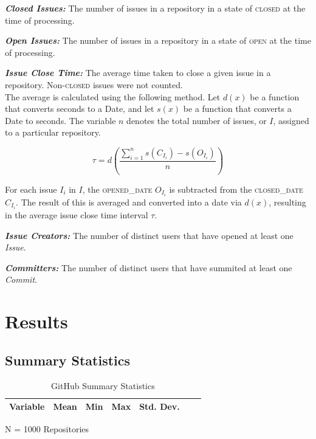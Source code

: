 \documentclass{proc}
\begin{document}
\noindent \textbf{\textit{Closed Issues:}}
The number of issues in a repository in a state of \textsc{closed} at the time of processing.

\noindent \textbf{\textit{Open Issues:}}
The number of issues in a repository in a state of \textsc{open} at the time of processing.

\noindent \textbf{\textit{Issue Close Time:}}
The average time taken to close a given issue in a repository. Non-\textsc{closed} issues were not counted.\\

The average is calculated using the following method. Let $d(x)$ be a function that converts seconds to a Date, and let $s(x)$ be a function that converts a Date to seconds. The variable $n$ denotes the total number of issues, or $I$, assigned to a particular repository.

\[ \tau = d\left( \frac{\sum_{i=1}^{n} s(C_{I_i} ) - s(O_{I_i} )  } {n} \right) \]

For each issue $I_i$ in $I$, the \textsc{opened\_date} $O_{I_i}$ is subtracted from the \textsc{closed\_date} $C_{I_i}$. The result of this is averaged and converted into a date via $d(x)$, resulting in the average issue close time interval $\tau$.

\noindent \textbf{\textit{Issue Creators:}}
The number of distinct users that have opened at least one \textit{Issue}.

\noindent \textbf{\textit{Committers:}}
The number of distinct users that have summited at least one \textit{Commit}.

\section{Results}

\subsection{Summary Statistics}
\begin{table}[!ht]
\begin{center}
\begin{tabular}{rrrrrrr}
\hline
Variable & Mean & Min & Max & Std. Dev. \\
\hline

\hline
\end{tabular}
N = 1000 Repositories
\caption{GitHub Summary Statistics}
\label{table:summary_stats}
\end{center}
\end{table}
\end{document}
